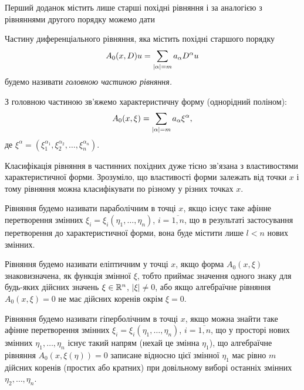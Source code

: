 Перший доданок містить лише старші похідні рівняння і за аналогією з рівняннями другого порядку можемо дати

\begin{definition}
	Частину диференціального рівняння, яка містить похідні старшого порядку 
	\begin{equation}
		A_0(x, D) u = \displaystyle\sum\limits_{|\alpha|=m}a_\alpha D^\alpha u
	\end{equation}
	будемо називати \it{головною} частиною рівняння.
\end{definition}

З головною частиною зв'яжемо характеристичну форму (однорідний поліном):
\begin{equation}
	A_0(x, \xi) = \displaystyle\sum\limits_{|\alpha|=m}a_\alpha \xi^\alpha,
\end{equation}
де $\xi^\alpha = (\xi_1^{\alpha_1}, \xi_2^{\alpha_2}, \ldots, \xi_n^{\alpha_n})$. \medskip

Класифікація рівняння в частинних похідних дуже тісно зв'язана з властивостями характеристичної форми. Зрозуміло, що властивості форми залежать від точки $x$ і тому рівняння можна класифікувати по різному у різних точках $x$. \medskip

\begin{definition}
	Рівняння будемо називати параболічним в точці $x$, якщо існує таке афінне перетворення змінних $\xi_i = \xi_i(\eta_1, \ldots, \eta_n)$, $i = \overline{1,n}$, що в результаті застосування перетворення до характеристичної форми, вона буде містити лише $l < n$ нових змінних.
\end{definition}

\begin{definition}
	Рівняння будемо називати еліптичним у точці $x$, якщо форма $A_0(x, \xi)$ знаковизначена, як функція змінної $\xi$, тобто приймає значення одного знаку для будь-яких дійсних значень $\xi \in \mathbb{R}^n$, $|\xi|\ne0$, або якщо алгебраїчне рівняння $A_0(x,\xi) = 0$ не має дійсних коренів окрім $\xi = 0$.
\end{definition}

\begin{definition}
	Рівняння будемо називати гіперболічним в точці $x$, якщо можна знайти таке афінне перетворення змінних $\xi_i = \xi_i(\eta_1, \ldots, \eta_n)$, $i = \overline{1,n}$, що у просторі нових змінних $\eta_1, \ldots, \eta_n$ існує такий напрям (нехай це змінна $\eta_1$), що алгебраїчне рівняння $A_0(x, \xi(\eta)) = 0$ записане відносно цієї змінної $\eta_1$ має рівно $m$ дійсних коренів (простих або кратних) при довільному виборі останніх змінних $\eta_2, \ldots, \eta_n$.
\end{definition}

